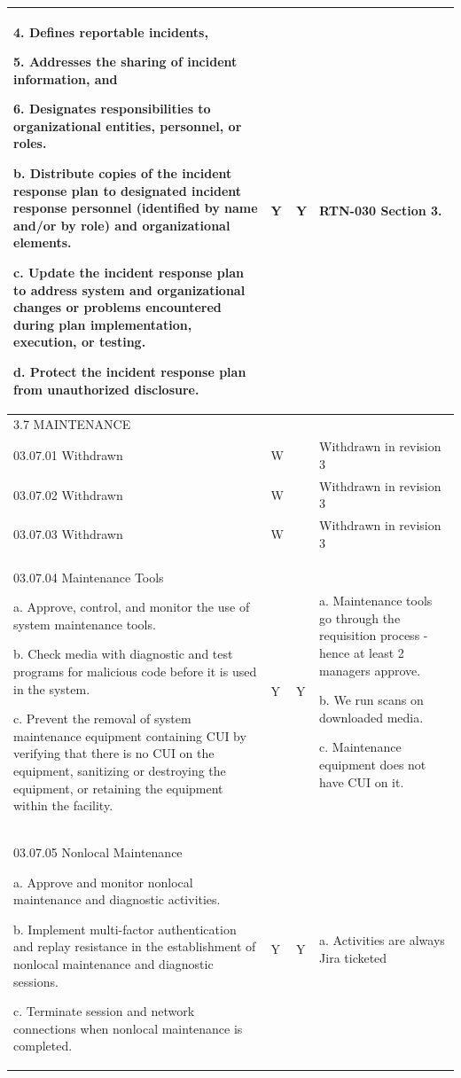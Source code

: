 \begin{longtable} {|p{}|p{}|p{}|p{} |}
{4. Defines reportable incidents,

5. Addresses the sharing of incident information, and

6. Designates responsibilities to organizational entities, personnel, or roles.

b. Distribute copies of the incident response plan to designated incident response personnel (identified by name and/or by role) and organizational elements.

c. Update the incident response plan to address system and organizational changes or problems encountered during plan implementation, execution, or testing.

d. Protect the incident response plan from unauthorized disclosure.}&{Y}&{Y}&{RTN-030 Section 3.} \\ \hline
{3.7 MAINTENANCE}&&& \\ \hline
{03.07.01 Withdrawn}&{W}&{}&{Withdrawn in revision 3} \\ \hline
{03.07.02 Withdrawn}&{W}&{}&{Withdrawn in revision 3} \\ \hline
{03.07.03 Withdrawn}&{W}&{}&{Withdrawn in revision 3} \\ \hline
{03.07.04 Maintenance Tools

a. Approve, control, and monitor the use of system maintenance tools.

b. Check media with diagnostic and test programs for malicious code before it is used in the system.

c. Prevent the removal of system maintenance equipment containing CUI by verifying that there is no CUI on the equipment, sanitizing or destroying the equipment, or retaining the equipment within the facility.}&{Y}&{Y}&{a. Maintenance tools go through the requisition process - hence at least 2 managers approve.

b. We run scans on downloaded media.

c. Maintenance equipment does not have CUI on it. } \\ \hline
{03.07.05 Nonlocal Maintenance

a. Approve and monitor nonlocal maintenance and diagnostic activities.

b. Implement multi-factor authentication and replay resistance in the establishment of nonlocal maintenance and diagnostic sessions.

c. Terminate session and network connections when nonlocal maintenance is completed.}&{Y}&{Y}&{a. Activities are always Jira ticketed

}
\end{longtable}
